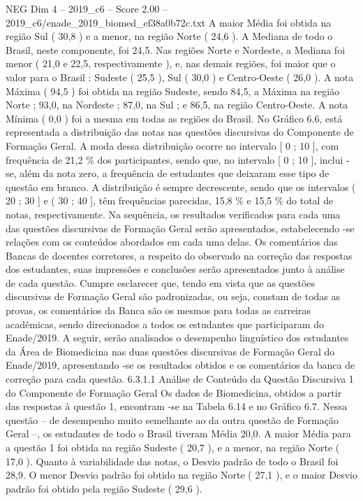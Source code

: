 \begin{textsample}{NEG Dim 4 – 2019\_c6 – Score 2.00 – 2019\_c6/enade\_2019\_biomed\_ef38a0b72c.txt}
A maior Média foi obtida na região Sul ( 30,8 ) e a menor, na região Norte ( 24,6 ).
A Mediana de todo o Brasil, neste componente, foi 24,5.
Nas regiões Norte e Nordeste, a Mediana foi menor ( 21,0 e 22,5, respectivamente ), e, nas demais regiões, foi maior que o valor para o Brasil : Sudeste ( 25,5 ), Sul ( 30,0 ) e Centro-Oeste ( 26,0 ).
A nota Máxima ( 94,5 ) foi obtida na região Sudeste, sendo 84,5, a Máxima na região Norte ; 93,0, na Nordeste ; 87,0, na Sul ; e 86,5, na região Centro-Oeste.
A nota Mínima ( 0,0 ) foi a mesma em todas as regiões do Brasil.
No Gráfico 6.6, está representada a distribuição das notas nas questões discursivas do Componente de Formação Geral.
A moda dessa distribuição ocorre no intervalo [ 0 ; 10 ], com frequência de 21,2 \% dos participantes, sendo que, no intervalo [ 0 ; 10 ], inclui -se, além da nota zero, a frequência de estudantes que deixaram esse tipo de questão em branco.
A distribuição é sempre decrescente, sendo que os intervalos ( 20 ; 30 ] e ( 30 ; 40 ], têm frequências parecidas, 15,8 \% e 15,5 \% do total de notas, respectivamente.
Na sequência, os resultados verificados para cada uma das questões discursivas de Formação Geral serão apresentados, estabelecendo -se relações com os conteúdos abordados em cada uma delas.
Os comentários das Bancas de docentes corretores, a respeito do observado na correção das respostas dos estudantes, suas impressões e conclusões serão apresentados junto à análise de cada questão.
Cumpre esclarecer que, tendo em vista que as questões discursivas de Formação Geral são padronizadas, ou seja, constam de todas as provas, os comentários da Banca são os mesmos para todas as carreiras acadêmicas, sendo direcionados a todos os estudantes que participaram do Enade/2019.
A seguir, serão analisados o desempenho linguístico dos estudantes da Área de Biomedicina nas duas questões discursivas de Formação Geral do Enade/2019, apresentando -se os resultados obtidos e os comentários da banca de correção para cada questão. 6.3.1.1 Análise de Conteúdo da Questão Discursiva 1 do Componente de Formação Geral Os dados de Biomedicina, obtidos a partir das respostas à questão 1, encontram -se na Tabela 6.14 e no Gráfico 6.7.
Nessa questão – de desempenho muito semelhante ao da outra questão de Formação Geral –, os estudantes de todo o Brasil tiveram Média 20,0.
A maior Média para a questão 1 foi obtida na região Sudeste ( 20,7 ), e a menor, na região Norte ( 17,0 ).
Quanto à variabilidade das notas, o Desvio padrão de todo o Brasil foi 28,9.
O menor Desvio padrão foi obtido na região Norte ( 27,1 ), e o maior Desvio padrão foi obtido pela região Sudeste ( 29,6 ).

\end{textsample}
